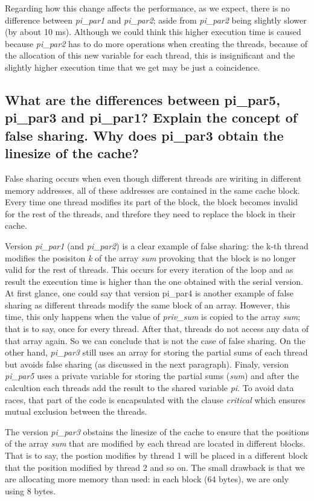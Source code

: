 \documentclass{article}
\newcommand{\question}[1]{\subsection{#1}}
\begin{document}
Regarding how this change affects the performance, as we expect, there is no difference between \emph{pi\_par1} and \emph{pi\_par2}; aside from \emph{pi\_par2} being slightly slower (by about 10 ms). Although we could think this higher execution time is caused because \emph{pi\_par2} has to do more operations when creating the threads, because of the allocation of this new variable for each thread, this is insignificant and the slightly higher execution time that we get may be just a coincidence.

\question{What are the differences between pi\_par5, pi\_par3 and pi\_par1? Explain the concept of false sharing. 
Why does pi\_par3 obtain the linesize of the cache?}

False sharing occurs when even though different threads are wiriting in different memory addresses, all of these addresses are contained in the same cache block. Every time one thread modifies its part of the block, the block becomes invalid for the rest of the threads, and threfore they need to replace the block in their cache.

Version \emph{pi\_par1} (and \emph{pi\_par2}) is a clear example of false sharing: the k-th thread modifies the posisiton \emph{k} of the array \emph{sum} provoking that the block is no longer valid for the rest of threads. This occurs for every iteration of the loop and as result the execution time is higher than the one obtained with the serial version. At first glance, one could say that version pi\_par4 is another example of false sharing as different threads modify the same block of an array. However, this time, this only happens when the value of \emph{priv\_sum} is copied to the array \emph{sum}; that is to say, once for every thread. After that, threads do not access any data of that array again. So we can conclude that is not the case of false sharing. On the other hand, \emph{pi\_par3} still uses an array for storing the partial sums of each thread but avoids false sharing (as discussed in the next paragraph). Finaly, version \emph{pi\_par5} uses a private variable for storing the partial sums (\emph{sum}) and after the calcultion each threads add the result to the shared variable \emph{pi}. To avoid data races, that part of the code is encapsulated with the clause \emph{critical} which ensures mutual exclusion between the threads.

The version \emph{pi\_par3} obstains the linesize of the cache to ensure that the positions of the array \emph{sum} that are modified by each thread are located in different blocks. That is to say, the postion modifies by thread 1 will be placed in a different block that the position modified by thread 2 and so on. The small drawback is that we are allocating more memory than used: in each block (64 bytes), we are only using 8 bytes. 
\end{document}
